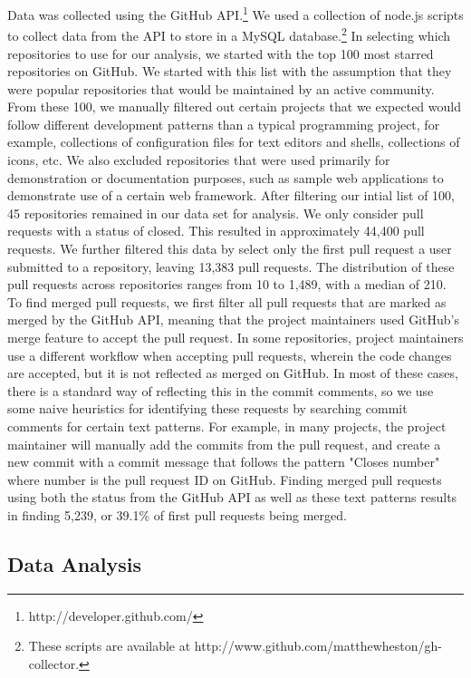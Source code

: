 \documentclass{sigchi}
\begin{document}
Data was collected using the GitHub API.\footnote{http://developer.github.com/}
We used a collection of node.js scripts to collect data from the API to store in
a MySQL database.\footnote{These scripts are available at
http://www.github.com/matthewheston/gh-collector.} In selecting which
repositories to use for our analysis, we started with the top 100 most starred
repositories on GitHub. We started with this list with the assumption that they
were popular repositories that would be maintained by an active community. From
these 100, we manually filtered out certain projects that we expected would
follow different development patterns than a typical programming project, for
example, collections of configuration files for text editors and shells,
collections of icons, etc. We also excluded repositories that were used
primarily for demonstration or documentation purposes, such as sample web
applications to demonstrate use of a certain web framework. After filtering our
intial list of 100, 45 repositories remained in our data set for analysis. We
only consider pull requests with a status of closed. This resulted in
approximately 44,400 pull requests. We further filtered this data by select only
the first pull request a user submitted to a repository, leaving 13,383 pull
requests. The distribution of these pull requests across repositories ranges
from 10 to 1,489, with a median of 210. To find merged pull requests, we first
filter all pull requests that are marked as merged by the GitHub API, meaning
that the project maintainers used GitHub's merge feature to accept the pull
request. In some repositories, project maintainers use a different workflow when
accepting pull requests, wherein the code changes are accepted, but it is not
reflected as merged on GitHub. In most of these cases, there is a standard way
of reflecting this in the commit comments, so we use some naive heuristics for
identifying these requests by searching commit comments for certain text
patterns. For example, in many projects, the project maintainer will manually
add the commits from the pull request, and create a new commit with a commit
message that follows the pattern "Closes {number}" where {number} is the pull
request ID on GitHub. Finding merged pull requests using both the status from
the GitHub API as well as these text patterns results in finding 5,239, or
39.1\% of first pull requests being merged.

\subsection{Data Analysis} \label{sec:data_analysis}
\end{document}
